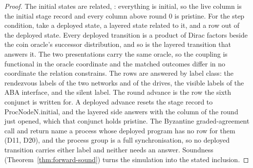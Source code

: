 \begin{proof}\leanok
  The initial states are related, : everything is initial, so the live column is the initial stage record and every column above round $0$ is pristine.
  For the step condition, take a deployed state, a layered state related to it, and a row out of the deployed state.
  Every deployed transition is a product of Dirac factors beside the coin oracle's successor distribution, and so is the layered transition that answers it.
  The two presentations carry the same oracle, so the coupling is functional in the oracle coordinate and the matched outcomes differ in no coordinate the relation constrains.
  The rows are answered by label class: the rendezvous labels of the two networks and of the drives, the visible labels of the ABA interface, and the silent label.
  The round advance is the row the sixth conjunct is written for.
  A deployed advance resets the stage record to $\mathrm{ProcNodeN.initial}$, and the layered side answers with the column of the round just opened, which that conjunct holds pristine.
  The Byzantine graded-agreement call and return name a process whose deployed program has no row for them (D11, D20), and the process group is a full synchronisation, so no deployed transition carries either label and neither needs an answer.
  Soundness (Theorem~\ref{thm:forward-sound}) turns the simulation  into the stated inclusion.
\end{proof}
